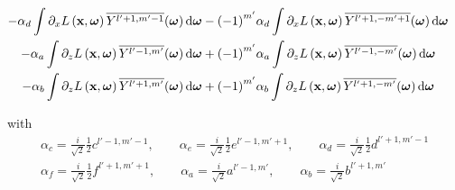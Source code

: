 \begin{align*}
\\
-\alpha_d\int{\partial_xL\left (\boldsymbol{\mathbf{x}} ,\boldsymbol{\mathbf{\omega}} \right )\overline{Y^{l'+1, m'-1}}(\boldsymbol{\mathbf{\omega}} )\,\mathrm{d}\boldsymbol{\mathbf{\omega}}}
-\left({-1}\right)^{m'}&\alpha_d\int{\partial_xL\left (\boldsymbol{\mathbf{x}} ,\boldsymbol{\mathbf{\omega}} \right )\overline{Y^{l'+1, -m'+1}}(\boldsymbol{\mathbf{\omega}} )\,\mathrm{d}\boldsymbol{\mathbf{\omega}}}
\\
-\alpha_a\int{\partial_zL\left (\boldsymbol{\mathbf{x}} ,\boldsymbol{\mathbf{\omega}} \right )\overline{Y^{l'-1, m'}}(\boldsymbol{\mathbf{\omega}} )\,\mathrm{d}\boldsymbol{\mathbf{\omega}}}
+\left({-1}\right)^{m'}&\alpha_a\int{\partial_zL\left (\boldsymbol{\mathbf{x}} ,\boldsymbol{\mathbf{\omega}} \right )\overline{Y^{l'-1, -m'}}(\boldsymbol{\mathbf{\omega}} )\,\mathrm{d}\boldsymbol{\mathbf{\omega}}}
\\
-\alpha_b\int{\partial_zL\left (\boldsymbol{\mathbf{x}} ,\boldsymbol{\mathbf{\omega}} \right )\overline{Y^{l'+1, m'}}(\boldsymbol{\mathbf{\omega}} )\,\mathrm{d}\boldsymbol{\mathbf{\omega}}}
+\left({-1}\right)^{m'}&\alpha_b\int{\partial_zL\left (\boldsymbol{\mathbf{x}} ,\boldsymbol{\mathbf{\omega}} \right )\overline{Y^{l'+1, -m'}}(\boldsymbol{\mathbf{\omega}} )\,\mathrm{d}\boldsymbol{\mathbf{\omega}}}
\end{align*}

with 
\begin{align*}
\alpha_c = \frac{i}{\sqrt{2}}\frac{1}{2}c^{{l'-1,m'-1}}
,\qquad
\alpha_e = \frac{i}{\sqrt{2}}\frac{1}{2}e^{{l'-1,m'+1}}
,\qquad
\alpha_d = \frac{i}{\sqrt{2}}\frac{1}{2}d^{{l'+1,m'-1}}
\\
\alpha_f = \frac{i}{\sqrt{2}}\frac{1}{2}f^{{l'+1,m'+1}}
,\qquad
\alpha_a = \frac{i}{\sqrt{2}}a^{{l'-1,m'}}
,\qquad
\alpha_b = \frac{i}{\sqrt{2}}b^{{l'+1,m'}}
\end{align*}

